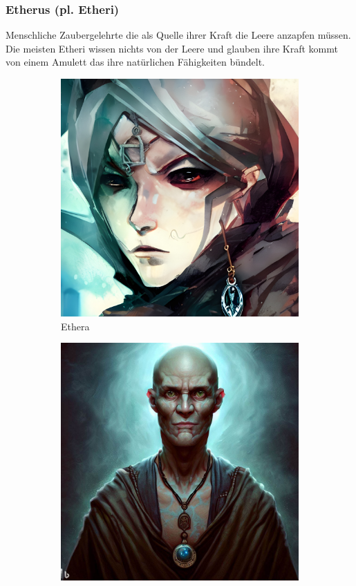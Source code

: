 \documentclass[11pt, twoside]{article}
\begin{document}
\subsubsection{Etherus (pl. Etheri)\label{etheri}}
\label{sec:org03b97bd}
Menschliche Zaubergelehrte die als Quelle ihrer Kraft die Leere anzapfen müssen. Die meisten Etheri wissen nichts von der Leere und glauben ihre Kraft kommt von einem Amulett das ihre natürlichen Fähigkeiten bündelt.
\begin{figure}[H]
\centering
\caption{Etheri}
\label{fig:etheri}
  \begin{subfigure}{0.3\textwidth}
    \centering
    \includegraphics[width=0.99\linewidth]{etheri1.jpeg}
    \caption{Ethera}
  \end{subfigure}%
  \begin{subfigure}{0.3\textwidth}
    \centering
    \includegraphics[width=0.99\linewidth]{etheri2.jpeg}

\end{subfigure}
\end{figure}
\end{document}
